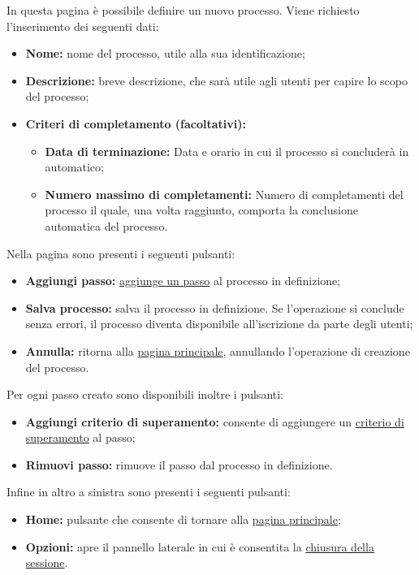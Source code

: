 In questa pagina è possibile definire un nuovo processo.
Viene richiesto l'inserimento dei seguenti dati:
\begin{itemize}
\item \textbf{Nome:} nome del processo, utile alla sua identificazione;
\item \textbf{Descrizione:} breve descrizione, che sarà utile agli utenti per capire lo scopo del processo;
\item \textbf{Criteri di completamento (facoltativi):} 
\begin{itemize}
\item \textbf{Data di terminazione:} Data e orario in cui il processo si concluderà in automatico;
\item \textbf{Numero massimo di completamenti:} Numero di completamenti del processo il quale, una volta raggiunto, comporta la conclusione automatica del processo.
\end{itemize}
\end{itemize}

Nella pagina sono presenti i seguenti pulsanti:
\begin{itemize}
\item \textbf{Aggiungi passo:} \hyperref[addstep]{aggiunge un passo} al processo in definizione;
\item \textbf{Salva processo:} salva il processo in definizione. Se l'operazione si conclude senza errori, il processo diventa disponibile all'iscrizione da parte degli utenti;
\item \textbf{Annulla:} ritorna alla \hyperref[home]{pagina principale}, annullando l'operazione di creazione del processo.
\end{itemize}
Per ogni passo creato sono disponibili inoltre i pulsanti:
\begin{itemize}
\item \textbf{Aggiungi criterio di superamento:} consente di aggiungere un \hyperref[vincoli]{criterio di superamento} al passo;
\item \textbf{Rimuovi passo:} rimuove il passo dal processo in definizione.
\end{itemize}
Infine in altro a sinistra sono presenti i seguenti pulsanti:
\begin{itemize}
\item \textbf{Home:} pulsante che consente di tornare alla \hyperref[home]{pagina principale};
\item \textbf{Opzioni:} apre il pannello laterale in cui è consentita la \hyperref[logout]{chiusura della sessione}.
\end{itemize}

